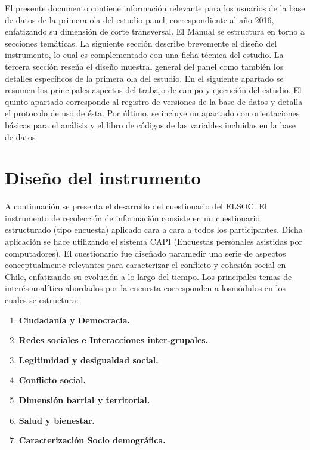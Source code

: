 \documentclass[
]{book}
\providecommand{\tightlist}{%
  \setlength{\itemsep}{0pt}\setlength{\parskip}{0pt}}
\begin{document}
El presente documento contiene información relevante para los usuarios de la base de datos de la primera ola del estudio panel, correspondiente al año 2016, enfatizando su dimensión de corte transversal. El Manual se estructura en torno a secciones temáticas. La siguiente sección describe brevemente el diseño del instrumento, lo cual es complementado con una ficha técnica del estudio. La tercera sección reseña el diseño muestral general del panel como también los detalles específicos de la primera ola del estudio. En el siguiente apartado se resumen los principales aspectos del trabajo de campo y ejecución del estudio. El quinto apartado corresponde al registro de versiones de la base de datos y detalla el protocolo de uso de ésta. Por último, se incluye un apartado con orientaciones básicas para el análisis y el libro de códigos de las variables incluidas en la base de datos

\hypertarget{dis_ins}{%
\chapter{Diseño del instrumento}\label{dis_ins}}

A continuación se presenta el desarrollo del cuestionario del ELSOC. El instrumento de recolección de información consiste en un cuestionario estructurado (tipo encuesta) aplicado cara a cara a todos los participantes. Dicha aplicación se hace utilizando el sistema CAPI (Encuestas personales asistidas por computadores). El cuestionario fue diseñado paramedir una serie de aspectos conceptualmente relevantes para caracterizar el conflicto y cohesión social en Chile, enfatizando su evolución a lo largo del tiempo. Los principales temas de interés analítico abordados por la encuesta corresponden a losmódulos en los cuales se estructura:

\begin{enumerate}
\def\labelenumi{\arabic{enumi}.}
\tightlist
\item
  \textbf{Ciudadanía y Democracia.}
\item
  \textbf{Redes sociales e Interacciones inter-grupales.}
\item
  \textbf{Legitimidad y desigualdad social.}
\item
  \textbf{Conflicto social.}
\item
  \textbf{Dimensión barrial y territorial.}
\item
  \textbf{Salud y bienestar.}
\item
  \textbf{Caracterización Socio demográfica.}
\end{enumerate}
\end{document}
